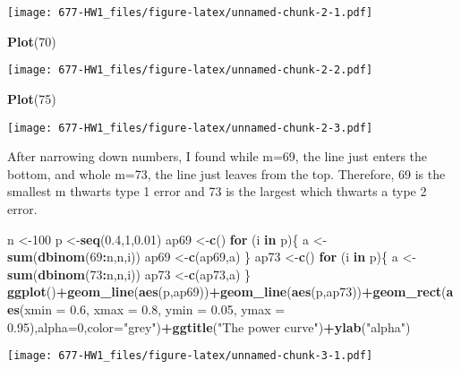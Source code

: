 \documentclass[
]{article}
\newenvironment{Shaded}{\begin{snugshade}}{\end{snugshade}}
\newcommand{\ControlFlowTok}[1]{\textcolor[rgb]{0.13,0.29,0.53}{\textbf{#1}}}
\newcommand{\DataTypeTok}[1]{\textcolor[rgb]{0.13,0.29,0.53}{#1}}
\newcommand{\DecValTok}[1]{\textcolor[rgb]{0.00,0.00,0.81}{#1}}
\newcommand{\FloatTok}[1]{\textcolor[rgb]{0.00,0.00,0.81}{#1}}
\newcommand{\KeywordTok}[1]{\textcolor[rgb]{0.13,0.29,0.53}{\textbf{#1}}}
\newcommand{\NormalTok}[1]{#1}
\newcommand{\OperatorTok}[1]{\textcolor[rgb]{0.81,0.36,0.00}{\textbf{#1}}}
\newcommand{\StringTok}[1]{\textcolor[rgb]{0.31,0.60,0.02}{#1}}
\begin{document}
\texttt{[image: 677-HW1\_files/figure-latex/unnamed-chunk-2-1.pdf]}

\begin{Shaded}
\begin{Highlighting}[]
\KeywordTok{Plot}\NormalTok{(}\DecValTok{70}\NormalTok{)}
\end{Highlighting}
\end{Shaded}

\texttt{[image: 677-HW1\_files/figure-latex/unnamed-chunk-2-2.pdf]}

\begin{Shaded}
\begin{Highlighting}[]
\KeywordTok{Plot}\NormalTok{(}\DecValTok{75}\NormalTok{)}
\end{Highlighting}
\end{Shaded}

\texttt{[image: 677-HW1\_files/figure-latex/unnamed-chunk-2-3.pdf]}

After narrowing down numbers, I found while m=69, the line just enters
the bottom, and whole m=73, the line just leaves from the top.
Therefore, 69 is the smallest m thwarts type 1 error and 73 is the
largest which thwarts a type 2 error.

\begin{Shaded}
\begin{Highlighting}[]
\NormalTok{n <-}\DecValTok{100}
\NormalTok{p <-}\KeywordTok{seq}\NormalTok{(}\FloatTok{0.4}\NormalTok{,}\DecValTok{1}\NormalTok{,}\FloatTok{0.01}\NormalTok{)}
\NormalTok{ap69 <-}\KeywordTok{c}\NormalTok{()}
\ControlFlowTok{for}\NormalTok{ (i }\ControlFlowTok{in}\NormalTok{ p)\{}
\NormalTok{  a <-}\StringTok{ }\KeywordTok{sum}\NormalTok{(}\KeywordTok{dbinom}\NormalTok{(}\DecValTok{69}\OperatorTok{:}\NormalTok{n,n,i))}
\NormalTok{  ap69 <-}\KeywordTok{c}\NormalTok{(ap69,a)}
\NormalTok{\}}
\NormalTok{ap73 <-}\KeywordTok{c}\NormalTok{()}
\ControlFlowTok{for}\NormalTok{ (i }\ControlFlowTok{in}\NormalTok{ p)\{}
\NormalTok{  a <-}\StringTok{ }\KeywordTok{sum}\NormalTok{(}\KeywordTok{dbinom}\NormalTok{(}\DecValTok{73}\OperatorTok{:}\NormalTok{n,n,i))}
\NormalTok{  ap73 <-}\KeywordTok{c}\NormalTok{(ap73,a)}
\NormalTok{\}}
\KeywordTok{ggplot}\NormalTok{()}\OperatorTok{+}\KeywordTok{geom_line}\NormalTok{(}\KeywordTok{aes}\NormalTok{(p,ap69))}\OperatorTok{+}\KeywordTok{geom_line}\NormalTok{(}\KeywordTok{aes}\NormalTok{(p,ap73))}\OperatorTok{+}\KeywordTok{geom_rect}\NormalTok{(}\KeywordTok{aes}\NormalTok{(}\DataTypeTok{xmin =} \FloatTok{0.6}\NormalTok{, }\DataTypeTok{xmax =} \FloatTok{0.8}\NormalTok{, }\DataTypeTok{ymin =} \FloatTok{0.05}\NormalTok{, }\DataTypeTok{ymax =} \FloatTok{0.95}\NormalTok{),}\DataTypeTok{alpha=}\DecValTok{0}\NormalTok{,}\DataTypeTok{color=}\StringTok{"grey"}\NormalTok{)}\OperatorTok{+}\KeywordTok{ggtitle}\NormalTok{(}\StringTok{"The power curve"}\NormalTok{)}\OperatorTok{+}\KeywordTok{ylab}\NormalTok{(}\StringTok{"alpha"}\NormalTok{)}
\end{Highlighting}
\end{Shaded}

\texttt{[image: 677-HW1\_files/figure-latex/unnamed-chunk-3-1.pdf]}
\end{document}
